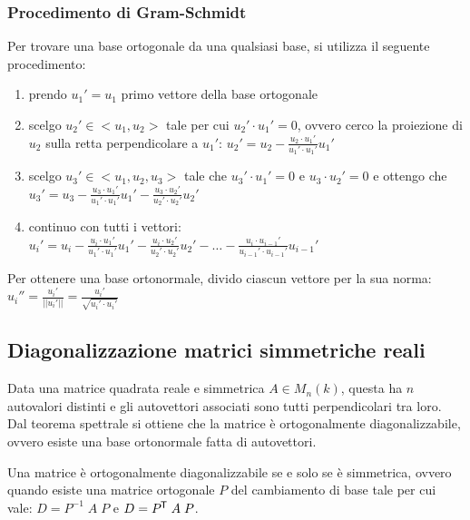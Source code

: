 \documentclass[a4paper]{article}
\newcommand\tran{^{\mkern-1.5mu\mathsf{T}}} %
\begin{document}
\subsubsection*{Procedimento di Gram-Schmidt}
Per trovare una base ortogonale da una qualsiasi base, si utilizza il seguente procedimento:
\begin{enumerate}[topsep=3pt, itemsep=0pt]
	\item prendo \(u_1' = u_1\) primo vettore della base ortogonale
	\item scelgo \(u_2' \in <u_1, u_2>\) tale per cui \(u_2' \cdot u_1' = 0\), ovvero cerco la proiezione di \(u_2\) sulla retta
	perpendicolare a \(u_1'\): \(\displaystyle u_2' = u_2 - \frac{u_2 \cdot u_1'}{u_1' \cdot u_1'} u_1'\)
	\item scelgo \(u_3' \in <u_1, u_2, u_3>\) tale che \(u_3' \cdot u_1' = 0\) e \(u_3 \cdot u_2' = 0\) e ottengo che
	\(\displaystyle u_3' = u_3 - \frac{u_3 \cdot u_1'}{u_1' \cdot u_1'} u_1' - \frac{u_3 \cdot u_2'}{u_2' \cdot u_2'} u_2'\)
	\item continuo con tutti i vettori: \(\displaystyle u_i' = u_i - \frac{u_i \cdot u_1'}{u_1' \cdot u_1'} u_1' - \frac{u_i \cdot u_2'}{u_2' \cdot u_2'} u_2' - \dots - \frac{u_i \cdot u_{i-1}'}{u_{i-1}' \cdot u_{i-1}'} u_{i-1}'\)
\end{enumerate}
Per ottenere una base ortonormale, divido ciascun vettore per la sua norma: \(\displaystyle u_i'' = \frac{u_i'}{||u_i'||} = \frac{ u_i'}{\sqrt{u_i' \cdot u_i'}}\)

\newpage

\subsection{Diagonalizzazione matrici simmetriche reali}
Data una matrice quadrata reale e simmetrica \(A \in M_n(k)\), questa ha \(n\) autovalori distinti e gli autovettori associati sono
tutti perpendicolari tra loro. Dal teorema spettrale si ottiene che la matrice è ortogonalmente diagonalizzabile, ovvero esiste una
base ortonormale fatta di autovettori.

Una matrice è ortogonalmente diagonalizzabile se e solo se è simmetrica, ovvero quando esiste una matrice ortogonale \(P\) del
cambiamento di base tale per cui vale: \(D = P^{-1} \; A \; P\) e \(D = P\tran \; A \; P\).
\end{document}
